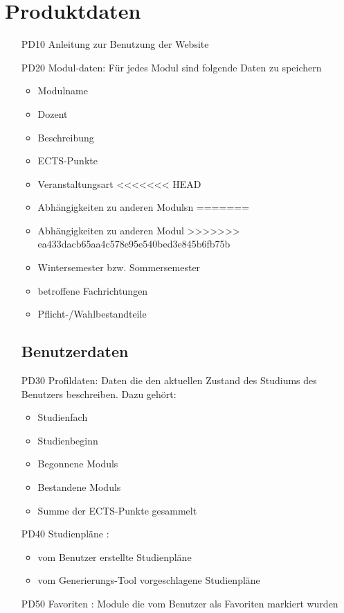 \section{Produktdaten}
	\begin{itemize}[nosep]
	\subsection{Systemdaten}
	\item[PD10]Anleitung zur Benutzung der 		Website
	\item[PD20] \gls{Modul}-daten: Für jedes \gls{Modul} sind folgende Daten zu speichern	
	\begin{itemize}
	\item Modulname
	\item Dozent
	\item Beschreibung
	\item \gls{ECTS-Punkte}
	\item Veranstaltungsart
<<<<<<< HEAD
	\item Abhängigkeiten zu anderen \glspl{Modul}n
=======
	\item Abhängigkeiten zu anderen \gls{Modul}
>>>>>>> ea433dacb65aa4c578e95e540bed3e845b6fb75b
	\item Wintersemester bzw. Sommersemester
	\item betroffene Fachrichtungen 
	\item Pflicht-/Wahlbestandteile
	\end{itemize}	 
	\subsection{Benutzerdaten}
	\item[PD30]Profildaten: Daten die den aktuellen Zustand des Studiums des Benutzers beschreiben. Dazu gehört: 
		\begin{itemize}
		\item Studienfach
		\item Studienbeginn
		\item Begonnene \glspl{Modul}
		\item Bestandene \glspl{Modul} 
		\item Summe der \gls{ECTS-Punkte} gesammelt
		\end{itemize}
\item[PD40]Studienpläne :
\begin{itemize}
\item 	vom Benutzer erstellte Studienpläne 
\item	vom \gls{Generierungs-Tool} vorgeschlagene Studienpläne 
\end{itemize} 
\item[PD50] Favoriten : Module die vom Benutzer als Favoriten markiert wurden
\end{itemize}